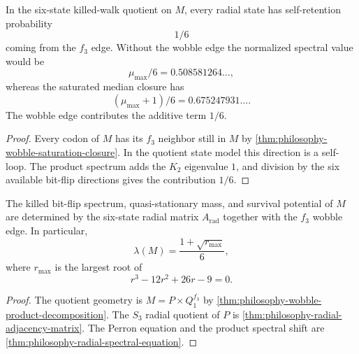 \begin{theorem}
\label{thm:philosophy-f3-self-loop-contribution}
In the six-state killed-walk quotient on $M$, every radial state has
self-retention probability
$$
  1/6
$$
coming from the $f_{3}$ edge. Without the wobble edge the normalized
spectral value would be
$$
  \mu_{\max}/6=0.508581264\ldots,
$$
whereas the saturated median closure has
$$
  (\mu_{\max}+1)/6=0.675247931\ldots.
$$
The wobble edge contributes the additive term $1/6$.
\end{theorem}
\begin{proof}
Every codon of $M$ has its $f_{3}$ neighbor still in $M$ by
\autoref{thm:philosophy-wobble-saturation-closure}. In the quotient
state model this direction is a self-loop. The product spectrum adds
the $K_{2}$ eigenvalue $1$, and division by the six available bit-flip
directions gives the contribution $1/6$.
\end{proof}

\begin{theorem}
\label{thm:philosophy-radial-wobble-spectrum}
The killed bit-flip spectrum, quasi-stationary mass, and survival
potential of $M$ are determined by the six-state radial matrix
$A_{\mathrm{rad}}$ together with the $f_{3}$ wobble edge. In particular,
$$
  \lambda(M)
  =
  \frac{1+\sqrt{r_{\max}}}{6},
$$
where $r_{\max}$ is the largest root of
$$
  r^{3}-12r^{2}+26r-9=0.
$$
\end{theorem}
\begin{proof}
The quotient geometry is
$M=P\times Q_{1}^{f_{3}}$ by
\autoref{thm:philosophy-wobble-product-decomposition}. The $S_{3}$
radial quotient of $P$ is
\autoref{thm:philosophy-radial-adjacency-matrix}. The Perron equation
and the product spectral shift are
\autoref{thm:philosophy-radial-spectral-equation}.
\end{proof}

